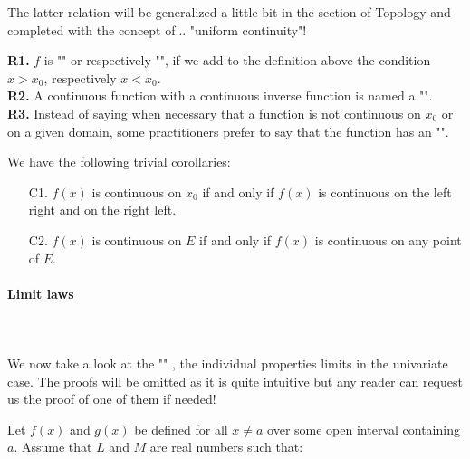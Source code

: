 	The latter relation will be generalized a little bit in the section of Topology and completed with the concept of... "uniform continuity"!
	\begin{tcolorbox}[title=Remarks,colframe=black,arc=10pt]
	\textbf{R1. }$f$ is "" or respectively "", if we add to the definition above the condition $x>x_0$, respectively $x<x_0$.\\
	
	\textbf{R2.} A continuous function with a continuous inverse function is named a "".\\
	
	\textbf{R3.} Instead of saying when necessary that a function is not continuous on $x_0$ or on a given domain, some practitioners prefer to say that the function has an "".
	\end{tcolorbox}	
	We have the following trivial corollaries:
	\begin{enumerate}
		\item[C1.] $f(x)$ is continuous on $x_0$ if and only if $f(x)$ is continuous on the left right and on the right left.
		
		\item[C2.] $f(x)$ is continuous on $E$ if and only if $f(x)$ is continuous on any point of $E$.
	\end{enumerate}
	
	\paragraph{Limit laws}\mbox{}\\\\
	We now take a look at the "" , the individual properties limits in the univariate case. The proofs will be omitted as it is quite intuitive but any reader can request us the proof of one of them if needed!
	
	Let $f(x)$ and $g(x)$ be defined for all $x\neq a$ over some open interval containing $a$. Assume that $L$ and $M$ are real numbers such that:
	
